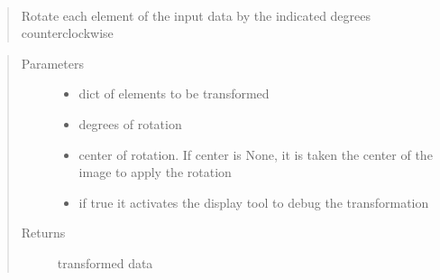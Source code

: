 \documentclass[letterpaper,10pt,english]{sphinxmanual}
\begin{document}

\begin{fulllineitems}
\label{\detokenize{ida_lib.operations:ida_lib.operations.transforms.rotate}}~\begin{quote}

Rotate each element of the input data by the indicated degrees counterclockwise
\end{quote}
\begin{quote}\begin{description}
\item[{Parameters}] \leavevmode\begin{itemize}
\item {} 
 \textendash{} dict of elements to be transformed

\item {} 
 \textendash{} degrees of rotation

\item {} 
 \textendash{} center of rotation. If center is None, it is taken the center of the image to apply the rotation

\item {} 
 \textendash{} if true it activates the display tool to debug the transformation

\end{itemize}

\item[{Returns}] \leavevmode
transformed data

\end{description}\end{quote}

\end{fulllineitems}

\end{document}
